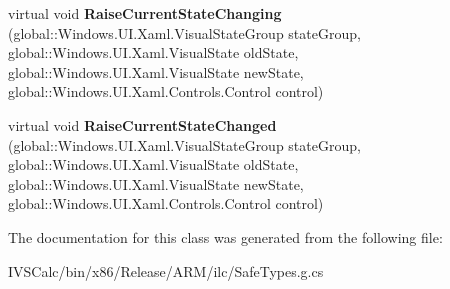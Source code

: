 \begin{DoxyCompactItemize}
virtual void {\bfseries Raise\+Current\+State\+Changing} (global\+::\+Windows.\+U\+I.\+Xaml.\+Visual\+State\+Group state\+Group, global\+::\+Windows.\+U\+I.\+Xaml.\+Visual\+State old\+State, global\+::\+Windows.\+U\+I.\+Xaml.\+Visual\+State new\+State, global\+::\+Windows.\+U\+I.\+Xaml.\+Controls.\+Control control)
\item 
\mbox{\label{class_windows_1_1_u_i_1_1_xaml_1_1_visual_state_manager_a64847abd05cfc83d3fd14ec421fe7261}} 
virtual void {\bfseries Raise\+Current\+State\+Changed} (global\+::\+Windows.\+U\+I.\+Xaml.\+Visual\+State\+Group state\+Group, global\+::\+Windows.\+U\+I.\+Xaml.\+Visual\+State old\+State, global\+::\+Windows.\+U\+I.\+Xaml.\+Visual\+State new\+State, global\+::\+Windows.\+U\+I.\+Xaml.\+Controls.\+Control control)
\end{DoxyCompactItemize}


The documentation for this class was generated from the following file\+:\begin{DoxyCompactItemize}
\item 
I\+V\+S\+Calc/bin/x86/\+Release/\+A\+R\+M/ilc/Safe\+Types.\+g.\+cs\end{DoxyCompactItemize}
